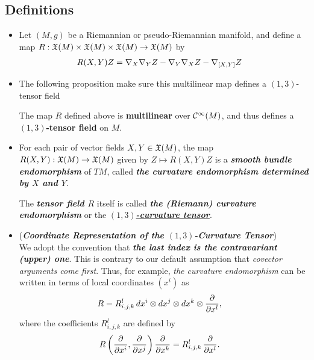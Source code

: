 \documentclass[11pt]{article}
\begin{document}
\subsection{Definitions}
\begin{itemize}
\item \begin{definition}
Let $(M,g)$ be a Riemannian or pseudo-Riemannian manifold, and define a map $R: {\mathfrak X}(M) \times {\mathfrak X}(M) \times {\mathfrak X}(M) \rightarrow {\mathfrak X}(M)$ by
\begin{align}
R(X, Y)Z &= \nabla_{X}{\nabla_{Y}{Z}} - \nabla_{Y}{\nabla_{X}{Z}}  -  \nabla_{[X, Y]}{Z} \label{eqn: curvature_def}
\end{align}
\end{definition}

\item The following proposition make sure this multilinear map defines a $(1,3)$-tensor field
\begin{proposition}
The map $R$ defined above is \textbf{multilinear} over ${\mathcal C}^{\infty}(M)$, and thus defines a \textbf{$(1,3)$-tensor field} on $M$.
\end{proposition}

\item \begin{definition}
For each pair of vector fields $X, Y \in {\mathfrak X}(M)$, the map $R(X,Y): {\mathfrak X}(M) \rightarrow {\mathfrak X}(M)$ given by $Z \mapsto R(X,Y)Z$ is a \emph{\textbf{smooth bundle endomorphism}} of $TM$, called \emph{\textbf{the curvature endomorphism determined by $X$ and $Y$}}.

The \emph{\textbf{tensor field $R$}} itself is called \emph{\textbf{the (Riemann) curvature endomorphism}} or the \underline{\emph{\textbf{$(1, 3)$-curvature tensor}}}. 
\end{definition}

\item \begin{remark} (\emph{\textbf{Coordinate Representation of the $(1,3)$-Curvature Tensor}})\\
We adopt the convention that \emph{\textbf{the last index is the contravariant (upper) one}}. This is contrary to our default assumption that \emph{covector arguments come first}. Thus, for example, \emph{the curvature endomorphism} can be written in terms of local coordinates $(x^i)$ as
\begin{align*}
R &= R_{i,j,k}^{l}\,dx^i \otimes dx^j \otimes dx^k \otimes \frac{\partial }{ \partial x^l},
\end{align*} where the coefficients $R_{i,j,k}^{l}$ are defined by
\begin{align*}
R\left(\frac{\partial }{ \partial x^i}, \frac{\partial }{ \partial x^j}\right)\frac{\partial }{ \partial x^k} &= R_{i,j,k}^{l}\, \frac{\partial }{ \partial x^l}.
\end{align*}
\end{remark}


\end{itemize}
\end{document}
